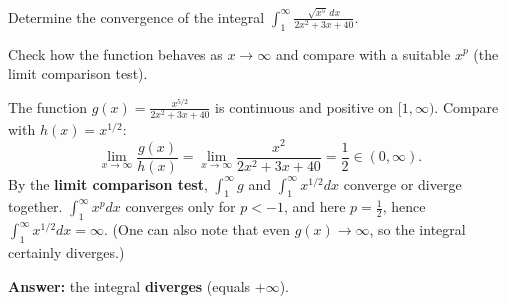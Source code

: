 
\begin{question}
Determine the convergence of the integral $\displaystyle\int_1^{\infty}\frac{\sqrt{x^5}\,dx}{2x^2+3x+40}$.
\end{question}

\begin{hint}
Check how the function behaves as $x\to\infty$ and compare with a suitable $x^{p}$ (the limit comparison test).
\end{hint}

\begin{solution}
The function $g(x)=\frac{x^{5/2}}{2x^2+3x+40}$ is continuous and positive on $[1,\infty)$. Compare with $h(x)=x^{1/2}$:
\[ \lim_{x\to\infty}\frac{g(x)}{h(x)}=\lim_{x\to\infty}\frac{x^2}{2x^2+3x+40}=\frac12\in(0,\infty). \]
By the \textbf{limit comparison test}, $\int_1^\infty g$ and $\int_1^\infty x^{1/2}dx$ converge or diverge together. $\int_1^\infty x^{p}dx$ converges only for $p<-1$, and here $p=\frac12$, hence $\int_1^\infty x^{1/2}dx=\infty$.
(One can also note that even $g(x)\to\infty$, so the integral certainly diverges.)

\textbf{Answer:} the integral \textbf{diverges} (equals $+\infty$).
\end{solution}
